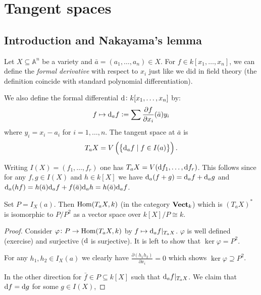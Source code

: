 \documentclass[11pt,a4paper]{article}
\newcommand{\A}{\mathbb A}
\begin{document}
\newpage

\section{Tangent spaces}

\subsection{Introduction and Nakayama's lemma}

Let $X \subseteq \A^n$ be a variety
and $\bar a = (a_1,\dots,a_n) \in X$.
For $f \in k[x_1,\dots,x_n]$,
we can define the \textit{formal derivative}
with respect to $x_i$ just like we did in field
theory (the definition coincide with standard polynomial
differentiation).

We also define the formal differential
$\mathrm{d} \colon k[x_1,\dots,x_n] $
by:
\[
    f \mapsto \mathrm{d}_a f := \sum \frac{\partial f}{\partial x_i}(\bar a) y_i
\]
where $y_i = x_i - a_i$ for $i=1,\dots,n$.
The tangent space at $\bar a$ is
\[
    T_a X = V\del{\set{\dif_a f \mid f \in I(a)}}.
\]

\begin{remark}
    Writing $I(X) = (f_1,\dots,f_r)$
    one has $T_a X = V(\mathrm{d} f_1,\dots,\mathrm{d} f_r)$.
    This follows since for any $f,g \in I(X)$
    and $h \in k[X]$ we have $\mathrm{d}_a(f + g) = \mathrm{d}_a f + \mathrm{d}_a g$ and $\mathrm{d}_a(hf) = h(\bar a) \mathrm{d}_a f + f(\bar a) \mathrm{d}_a h = h(\bar a) \mathrm{d}_a f$.
\end{remark}

\begin{lemma}
    Set $P = I_X(a)$.
    Then $\operatorname{Hom}(T_a X,k)$ (in the category $\mathbf{Vect}_k$)
    which is $(T_a X)^*$ is isomorphic to $P/P^2$
    as a vector space over $k[X]/P \cong k$.
\end{lemma}
\begin{proof}
    Consider $\varphi \colon P \to \operatorname{Hom}(T_a X,k)$
    by $f \mapsto \mathrm{d}_a f\vert_{T_a X}$.
    $\varphi$ is well defined (exercise) and surjective
    ($\mathrm{d}$ is surjective).
    It is left to show that $\ker \varphi = P^2$.

    For any $h_1,h_2 \in I_X(a)$ we clearly
    have $\frac{\partial (h_1 h_2)}{\partial x_i} = 0$
    which shows $\ker \varphi \supseteq P^2$.

    In the other direction for $\bar f \in P \subseteq k[X]$ such that $\mathrm{d}_a f\vert_{T_a X}$.
    We claim that $\mathrm{d} f = \mathrm{d} g$ for some
    $g \in I(X)$,
\end{proof}
\end{document}
